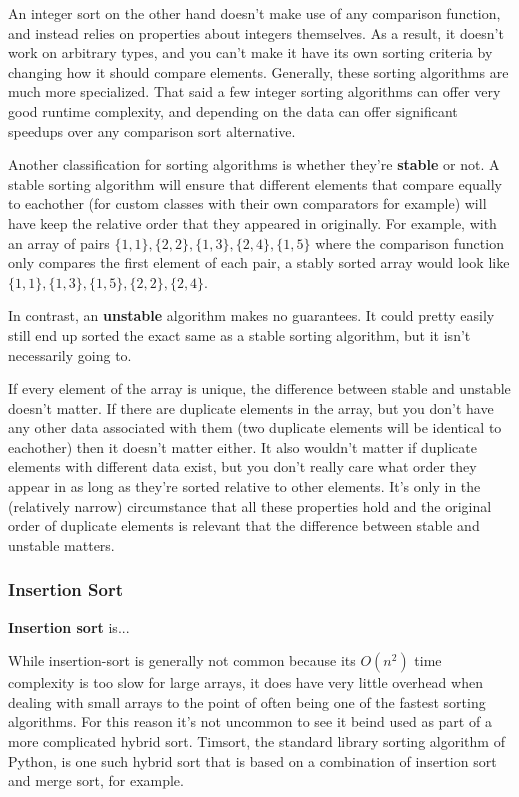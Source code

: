 An integer sort on the other hand doesn't make use of any comparison function, and instead relies on properties about integers themselves. As a result, it doesn't work on arbitrary types, and you can't make it have its own sorting criteria by changing how it should compare elements. Generally, these sorting algorithms are much more specialized. That said a few integer sorting algorithms can offer very good runtime complexity, and depending on the data can offer significant speedups over any comparison sort alternative.

Another classification for sorting algorithms is whether they're \textbf{stable} or not. A stable sorting algorithm will ensure that different elements that compare equally to eachother (for custom classes with their own comparators for example) will have keep the relative order that they appeared in originally. For example, with an array of pairs $\{1,1\}, \{2,2\}, \{1,3\}, \{2,4\}, \{1,5\}$ where the comparison function only compares the first element of each pair, a stably sorted array would look like $\{1,1\}, \{1,3\}, \{1,5\}, \{2,2\}, \{2,4\}$.

In contrast, an \textbf{unstable} algorithm makes no guarantees. It could pretty easily still end up sorted the exact same as a stable sorting algorithm, but it isn't necessarily going to.

If every element of the array is unique, the difference between stable and unstable doesn't matter. If there are duplicate elements in the array, but you don't have any other data associated with them (two duplicate elements will be identical to eachother) then it doesn't matter either. It also wouldn't matter if duplicate elements with different data exist, but you don't really care what order they appear in as long as they're sorted relative to other elements. It's only in the (relatively narrow) circumstance that all these properties hold and the original order of duplicate elements is relevant that the difference between stable and unstable matters.

\subsubsection{Insertion Sort}

\textbf{Insertion sort} is...

While insertion-sort is generally not common because its $O(n^2)$ time complexity is too slow for large arrays, it does have very little overhead when dealing with small arrays to the point of often being one of the fastest sorting algorithms. For this reason it's not uncommon to see it beind used as part of a more complicated hybrid sort. Timsort, the standard library sorting algorithm of Python, is one such hybrid sort that is based on a combination of insertion sort and merge sort, for example.

